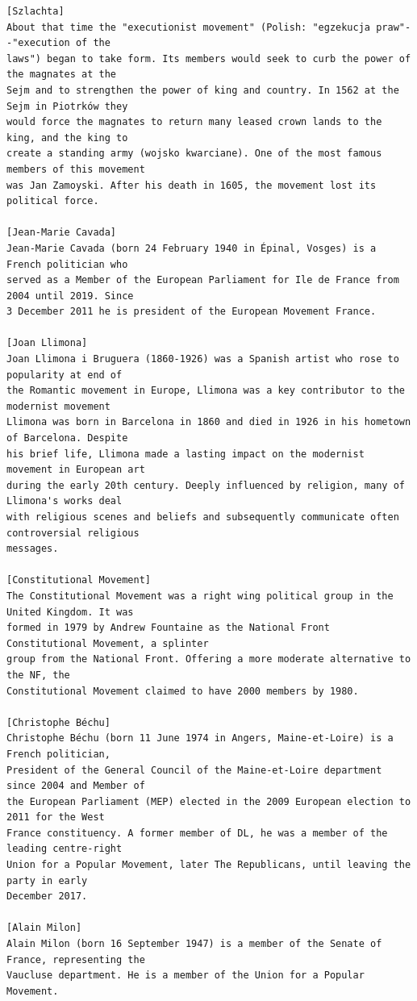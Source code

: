 \documentclass[10pt]{article}
\begin{document}
\begin{verbatim}
[Szlachta]
About that time the "executionist movement" (Polish: "egzekucja praw"--"execution of the
laws") began to take form. Its members would seek to curb the power of the magnates at the
Sejm and to strengthen the power of king and country. In 1562 at the Sejm in Piotrków they
would force the magnates to return many leased crown lands to the king, and the king to
create a standing army (wojsko kwarciane). One of the most famous members of this movement
was Jan Zamoyski. After his death in 1605, the movement lost its political force.

[Jean-Marie Cavada]
Jean-Marie Cavada (born 24 February 1940 in Épinal, Vosges) is a French politician who
served as a Member of the European Parliament for Ile de France from 2004 until 2019. Since
3 December 2011 he is president of the European Movement France.

[Joan Llimona]
Joan Llimona i Bruguera (1860-1926) was a Spanish artist who rose to popularity at end of
the Romantic movement in Europe, Llimona was a key contributor to the modernist movement
Llimona was born in Barcelona in 1860 and died in 1926 in his hometown of Barcelona. Despite
his brief life, Llimona made a lasting impact on the modernist movement in European art
during the early 20th century. Deeply influenced by religion, many of Llimona's works deal
with religious scenes and beliefs and subsequently communicate often controversial religious
messages.

[Constitutional Movement]
The Constitutional Movement was a right wing political group in the United Kingdom. It was
formed in 1979 by Andrew Fountaine as the National Front Constitutional Movement, a splinter
group from the National Front. Offering a more moderate alternative to the NF, the
Constitutional Movement claimed to have 2000 members by 1980.

[Christophe Béchu]
Christophe Béchu (born 11 June 1974 in Angers, Maine-et-Loire) is a French politician,
President of the General Council of the Maine-et-Loire department since 2004 and Member of
the European Parliament (MEP) elected in the 2009 European election to 2011 for the West
France constituency. A former member of DL, he was a member of the leading centre-right
Union for a Popular Movement, later The Republicans, until leaving the party in early
December 2017.

[Alain Milon]
Alain Milon (born 16 September 1947) is a member of the Senate of France, representing the
Vaucluse department. He is a member of the Union for a Popular Movement.


\end{verbatim}
\end{document}
